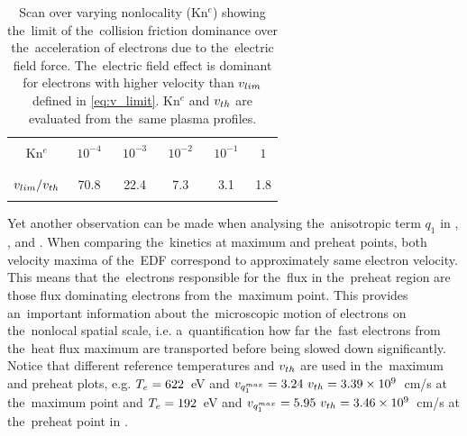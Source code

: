 \begin{table}
\begin{center}
  \begin{tabular}{c|ccccc}
    \hline\hline\\
    Kn$^e$ & $\,\,10^{-4}\,\,$ & $\,\,10^{-3}\,\,$ & $\,\,10^{-2}\,\,$ & $\,\,10^{-1}\,\,$ & $\,\,1\,\,$ \\\\
    \hline\\
    $v_{lim} / v_{th}$ & 70.8 & 22.4 & 7.3 & 3.1 & 1.8\\\\
    \hline\hline
  \end{tabular}
  \caption{
  Scan over varying nonlocality (Kn$^e$) showing the~limit of 
  the~collision friction dominance over the~acceleration of electrons 
  due to the~electric field force. The~electric field effect is dominant
  for electrons with higher velocity than $v_{lim}$ defined in 
  \eqref{eq:v_limit}. Kn$^e$ and $v_{th}$ are evaluated from the~same 
  plasma profiles.
  }
\label{tab:vlim}
\end{center}
\end{table}

Yet another observation can be made when analysing the~anisotropic term $q_1$ 
in , , and 
. When comparing the~kinetics at maximum and 
preheat points, both velocity maxima of the~EDF correspond to approximately 
same electron velocity. This means that the~electrons responsible for 
the~flux in the~preheat region are those flux dominating electrons 
from the~maximum point. This provides an~important information
about the~microscopic motion of electrons on the~nonlocal spatial scale, i.e. 
a~quantification how far the~fast electrons from the~heat flux maximum 
are transported before being slowed down significantly. 
Notice that different reference temperatures and $v_{th}$ are used 
in the~maximum and preheat plots, 
e.g. $T_e = 622$~eV and $v_{q_1^{max}} = 3.24~v_{th} = 3.39\times10^9$~cm/s 
at the~maximum point and $T_e = 192$~eV and 
$v_{q_1^{max}} = 5.95~v_{th} = 3.46\times10^9$~cm/s at the~preheat point
in .

 %

